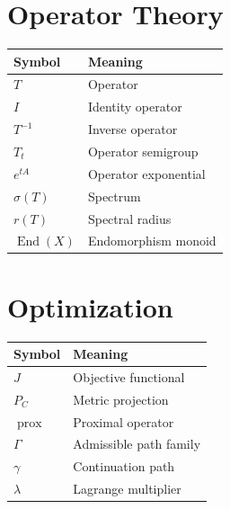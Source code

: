 \documentclass[11pt]{book}
\numberwithin{equation}{chapter}
\theoremstyle{definition}
\theoremstyle{plain}
\begin{document}

\section{Operator Theory}

\begin{center}

\begin{tabular}{ll}

Symbol & Meaning
\\
\hline

$T$ &
Operator
\\

$I$ &
Identity operator
\\

$T^{-1}$ &
Inverse operator
\\

$T_t$ &
Operator semigroup
\\

$e^{tA}$ &
Operator exponential
\\

$\sigma(T)$ &
Spectrum
\\

$r(T)$ &
Spectral radius
\\

$\operatorname{End}(X)$ &
Endomorphism monoid

\end{tabular}

\end{center}


\section{Optimization}

\begin{center}

\begin{tabular}{ll}

Symbol & Meaning
\\
\hline

$J$ &
Objective functional
\\

$P_C$ &
Metric projection
\\

$\operatorname{prox}$ &
Proximal operator
\\

$\Gamma$ &
Admissible path family
\\

$\gamma$ &
Continuation path
\\

$\lambda$ &
Lagrange multiplier

\end{tabular}

\end{center}
\end{document}
